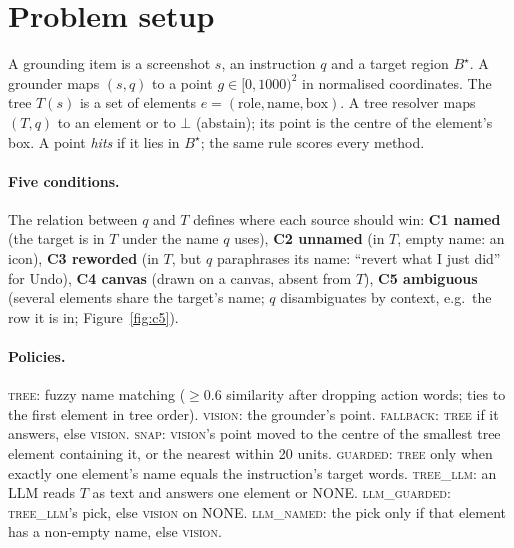 \documentclass[11pt]{article}
\newcommand{\tree}{\textsc{tree}}
\newcommand{\vis}{\textsc{vision}}
\newcommand{\fb}{\textsc{fallback}}
\begin{document}
\section{Problem setup}
\label{sec:setup}

A grounding item is a screenshot $s$, an instruction $q$ and a target region $B^\star$. A grounder maps
$(s,q)$ to a point $g \in [0,1000)^2$ in normalised coordinates. The tree $T(s)$ is a set of elements
$e=(\text{role},\text{name},\text{box})$. A tree resolver maps $(T,q)$ to an element or to $\bot$
(abstain); its point is the centre of the element's box. A point \emph{hits} if it lies in $B^\star$;
the same rule scores every method.

\paragraph{Five conditions.} The relation between $q$ and $T$ defines where each source should win:
\textbf{C1 named} (the target is in $T$ under the name $q$ uses), \textbf{C2 unnamed} (in $T$, empty name: an
icon), \textbf{C3 reworded} (in $T$, but $q$ paraphrases its name: ``revert what I just did'' for Undo),
\textbf{C4 canvas} (drawn on a canvas, absent from $T$), \textbf{C5 ambiguous} (several elements share the
target's name; $q$ disambiguates by context, e.g.\ the row it is in; Figure~\ref{fig:c5}).

\paragraph{Policies.} \tree: fuzzy name matching ($\ge$0.6 similarity after dropping action words; ties to
the first element in tree order). \vis: the grounder's point. \fb: \tree{} if it answers, else \vis.
\textsc{snap}: \vis's point moved to the centre of the smallest tree element containing it, or the nearest
within 20 units. \textsc{guarded}: \tree{} only when exactly one element's name equals the instruction's
target words. \textsc{tree\_llm}: an LLM reads $T$ as text and answers one element or NONE.
\textsc{llm\_guarded}: \textsc{tree\_llm}'s pick, else \vis{} on NONE. \textsc{llm\_named}: the pick only
if that element has a non-empty name, else \vis.
\end{document}
